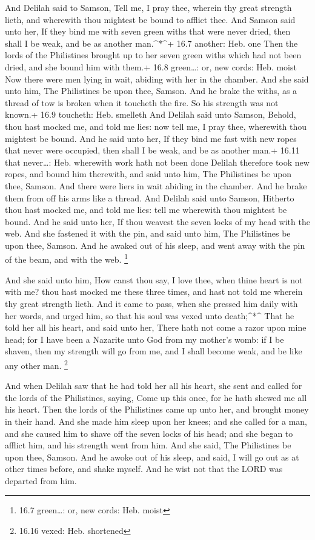  And Delilah said to Samson, Tell me, I pray thee, wherein
thy great strength lieth, and wherewith thou mightest be bound to
afflict thee.  And Samson said unto her, If they bind me
with seven green withs that were never dried, then shall I be weak, and
be as another man.\^{}*\^{}+ 16.7 another: Heb. one  Then
the lords of the Philistines brought up to her seven green withs which
had not been dried, and she bound him with them.+ 16.8 green\ldots: or,
new cords: Heb. moist  Now there were men lying in wait,
abiding with her in the chamber. And she said unto him, The Philistines
be upon thee, Samson. And he brake the withs, as a thread of tow is
broken when it toucheth the fire. So his strength was not known.+ 16.9
toucheth: Heb. smelleth  And Delilah said unto Samson,
Behold, thou hast mocked me, and told me lies: now tell me, I pray thee,
wherewith thou mightest be bound.  And he said unto her, If
they bind me fast with new ropes that never were occupied, then shall I
be weak, and be as another man.+ 16.11 that never\ldots: Heb. wherewith
work hath not been done  Delilah therefore took new ropes,
and bound him therewith, and said unto him, The Philistines be upon
thee, Samson. And there were liers in wait abiding in the chamber. And
he brake them from off his arms like a thread.  And Delilah
said unto Samson, Hitherto thou hast mocked me, and told me lies: tell
me wherewith thou mightest be bound. And he said unto her, If thou
weavest the seven locks of my head with the web.  And she
fastened it with the pin, and said unto him, The Philistines be upon
thee, Samson. And he awaked out of his sleep, and went away with the pin
of the beam, and with the web. \footnote{16.7 green\ldots: or, new
  cords: Heb. moist}

 And she said unto him, How canst thou say, I love thee,
when thine heart is not with me? thou hast mocked me these three times,
and hast not told me wherein thy great strength lieth.  And
it came to pass, when she pressed him daily with her words, and urged
him, so that his soul was vexed unto death;\^{}*\^{}  That
he told her all his heart, and said unto her, There hath not come a
razor upon mine head; for I have been a Nazarite unto God from my
mother's womb: if I be shaven, then my strength will go from me, and I
shall become weak, and be like any other man. \footnote{16.16 vexed:
  Heb. shortened}

 And when Delilah saw that he had told her all his heart,
she sent and called for the lords of the Philistines, saying, Come up
this once, for he hath shewed me all his heart. Then the lords of the
Philistines came up unto her, and brought money in their hand.
 And she made him sleep upon her knees; and she called for
a man, and she caused him to shave off the seven locks of his head; and
she began to afflict him, and his strength went from him. 
And she said, The Philistines be upon thee, Samson. And he awoke out of
his sleep, and said, I will go out as at other times before, and shake
myself. And he wist not that the LORD was departed from him.

